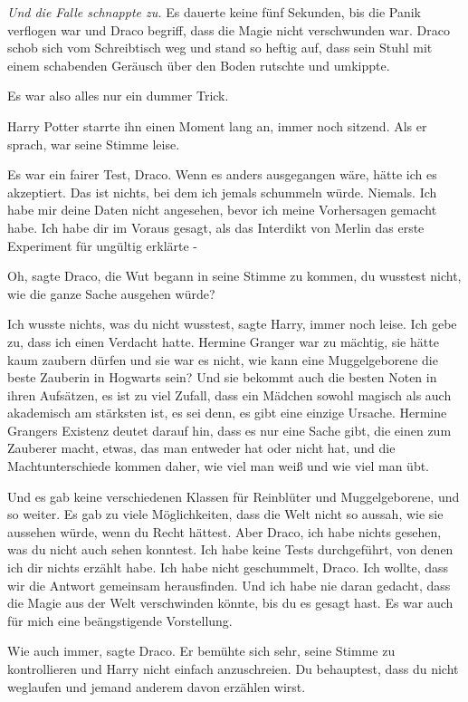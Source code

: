 \emph{ Und die Falle schnappte zu. } Es dauerte keine fünf Sekunden, bis die
Panik verflogen war und Draco begriff, dass die Magie nicht verschwunden war.
Draco schob sich vom Schreibtisch weg und stand so heftig auf, dass sein Stuhl
mit einem schabenden Geräusch über den Boden rutschte und umkippte.

\glqq Es war also alles nur ein dummer Trick.\grqq{}

Harry Potter starrte ihn einen Moment lang an, immer noch sitzend. Als er
sprach, war seine Stimme leise.

\glqq Es war ein fairer Test, Draco. Wenn es anders ausgegangen wäre, hätte ich
es akzeptiert. Das ist nichts, bei dem ich jemals schummeln würde. Niemals. Ich
habe mir deine Daten nicht angesehen, bevor ich meine Vorhersagen gemacht habe.
Ich habe dir im Voraus gesagt, als das Interdikt von Merlin das erste Experiment
für ungültig erklärte -\grqq{}

\glqq Oh\grqq{}, sagte Draco, die Wut begann in seine Stimme zu kommen, \glqq du
wusstest nicht, wie die ganze Sache ausgehen würde?\grqq{}

\glqq Ich wusste nichts, was du nicht wusstest\grqq{}, sagte Harry, immer noch
leise. \glqq Ich gebe zu, dass ich einen Verdacht hatte. Hermine Granger war zu
mächtig, sie hätte kaum zaubern dürfen und sie war es nicht, wie kann eine
Muggelgeborene die beste Zauberin in Hogwarts sein? Und sie bekommt auch die
besten Noten in ihren Aufsätzen, es ist zu viel Zufall, dass ein Mädchen sowohl
magisch als auch akademisch am stärksten ist, es sei denn, es gibt eine einzige
Ursache. Hermine Grangers Existenz deutet darauf hin, dass es nur eine Sache
gibt, die einen zum Zauberer macht, etwas, das man entweder hat oder nicht hat,
und die Machtunterschiede kommen daher, wie viel man weiß und wie viel man übt.

Und es gab keine verschiedenen Klassen für Reinblüter und Muggelgeborene, und so
weiter. Es gab zu viele Möglichkeiten, dass die Welt nicht so aussah, wie sie
aussehen würde, wenn du Recht hättest. Aber Draco, ich habe nichts gesehen, was
du nicht auch sehen konntest. Ich habe keine Tests durchgeführt, von denen ich
dir nichts erzählt habe. Ich habe nicht geschummelt, Draco. Ich wollte, dass wir
die Antwort gemeinsam herausfinden. Und ich habe nie daran gedacht, dass die
Magie aus der Welt verschwinden könnte, bis du es gesagt hast. Es war auch für
mich eine beängstigende Vorstellung.\grqq{}

\glqq Wie auch immer\grqq{}, sagte Draco. Er bemühte sich sehr, seine Stimme zu
kontrollieren und Harry nicht einfach anzuschreien. \glqq Du behauptest, dass du
nicht weglaufen und jemand anderem davon erzählen wirst.\grqq{}

